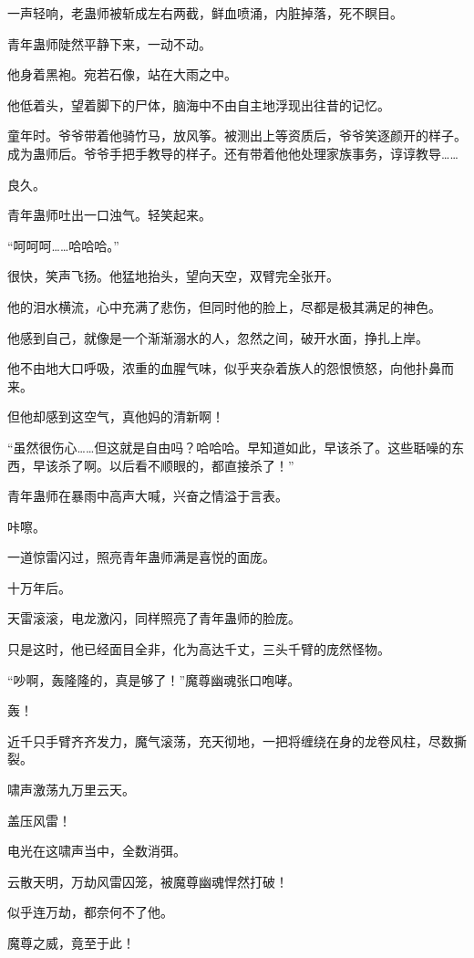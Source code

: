\begin{this_body}
一声轻响，老蛊师被斩成左右两截，鲜血喷涌，内脏掉落，死不瞑目。

青年蛊师陡然平静下来，一动不动。

他身着黑袍。宛若石像，站在大雨之中。

他低着头，望着脚下的尸体，脑海中不由自主地浮现出往昔的记忆。

童年时。爷爷带着他骑竹马，放风筝。被测出上等资质后，爷爷笑逐颜开的样子。成为蛊师后。爷爷手把手教导的样子。还有带着他他处理家族事务，谆谆教导……

良久。

青年蛊师吐出一口浊气。轻笑起来。

“呵呵呵……哈哈哈。”

很快，笑声飞扬。他猛地抬头，望向天空，双臂完全张开。

他的泪水横流，心中充满了悲伤，但同时他的脸上，尽都是极其满足的神色。

他感到自己，就像是一个渐渐溺水的人，忽然之间，破开水面，挣扎上岸。

他不由地大口呼吸，浓重的血腥气味，似乎夹杂着族人的怨恨愤怒，向他扑鼻而来。

但他却感到这空气，真他妈的清新啊！

“虽然很伤心……但这就是自由吗？哈哈哈。早知道如此，早该杀了。这些聒噪的东西，早该杀了啊。以后看不顺眼的，都直接杀了！”

青年蛊师在暴雨中高声大喊，兴奋之情溢于言表。

咔嚓。

一道惊雷闪过，照亮青年蛊师满是喜悦的面庞。

十万年后。

天雷滚滚，电龙激闪，同样照亮了青年蛊师的脸庞。

只是这时，他已经面目全非，化为高达千丈，三头千臂的庞然怪物。

“吵啊，轰隆隆的，真是够了！”魔尊幽魂张口咆哮。

轰！

近千只手臂齐齐发力，魔气滚荡，充天彻地，一把将缠绕在身的龙卷风柱，尽数撕裂。

啸声激荡九万里云天。

盖压风雷！

电光在这啸声当中，全数消弭。

云散天明，万劫风雷囚笼，被魔尊幽魂悍然打破！

似乎连万劫，都奈何不了他。

魔尊之威，竟至于此！


\end{this_body}
